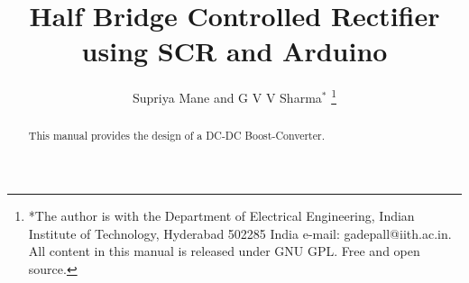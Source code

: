 \documentclass[journal,12pt,twocolumn]{IEEEtran}
\begin{document}









\def\putbox#1#2#3{\makebox[0in][l]{\makebox[#1][l]{}\raisebox{\baselineskip}[0in][0in]{\raisebox{#2}[0in][0in]{#3}}}}
     \def\rightbox#1{\makebox[0in][r]{#1}}
     \def\centbox#1{\makebox[0in]{#1}}
     \def\topbox#1{\raisebox{-\baselineskip}[0in][0in]{#1}}
     \def\midbox#1{\raisebox{-0.5\baselineskip}[0in][0in]{#1}}

\vspace{3cm}

\title{ 
Half Bridge Controlled Rectifier using SCR and Arduino
}

\author{Supriya Mane and  G V V Sharma$^{*}$%
	\thanks{*The author is with the Department
		of Electrical Engineering, Indian Institute of Technology, Hyderabad
		502285 India e-mail:  gadepall@iith.ac.in. All content in this manual is released under GNU GPL.  Free and open source.}
	
}	

\maketitle
\tableofcontents
\bigskip

\begin{abstract}
	
	This manual provides the design of a DC-DC Boost-Converter.
		
\end{abstract}
\end{document}
